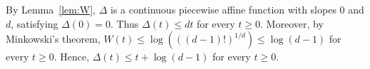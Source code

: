 \documentclass[12pt,reqno,a4paper]{amsart}%
\numberwithin{equation}{section}
\newcommand{\Rr}{{\mathbb{R}}}
\newcommand{\Zz}{{\mathbb{Z}}}
\def\SL{\operatorname{SL}}
\def\SLZ{\SL_d(\Zz)}
\def\SLR{\SL_d(\Rr)}
\begin{document}
\begin{remark}\label{rem:Minkowski}By Lemma~\ref{lem:W}, $\Delta$ is a continuous piecewise affine function with
slopes $0$ and $d$, satisfying $\Delta(0)=0$. Thus $\Delta(t)\leq dt$ for every $t\geq0$. Moreover, by Minkowski's theorem, $W(t)\leq \log(((d-1)!)^{1/d})\leq \log(d-1)$ for every $t\geq0$. Hence, $\Delta(t)\leq t+\log(d-1)$ for every $t\geq0$.
\end{remark}

	
%	
%	
%	
	
\end{document}
